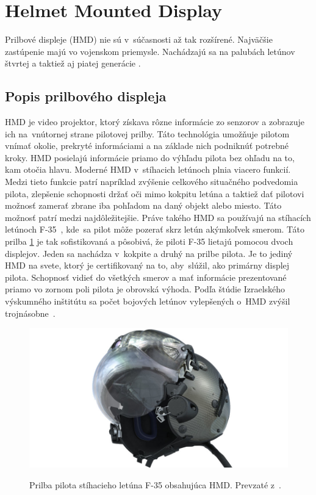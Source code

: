 \section{Helmet Mounted Display}
Prilbové displeje (HMD) nie sú v~súčasnosti až tak rozšírené. Najväčšie zastúpenie majú vo vojenskom priemysle. Nachádzajú sa na palubách letúnov štvrtej a taktiež aj piatej generácie \cite{HMDhelmet}.

\subsection{Popis prilbového displeja}
HMD je video projektor, ktorý získava rôzne informácie zo senzorov a zobrazuje ich na~vnútornej strane pilotovej prilby. Táto technológia umožňuje pilotom vnímať okolie, prekryté informáciami a na základe nich podniknúť potrebné kroky. HMD posielajú informácie priamo do výhľadu pilota bez ohľadu na to, kam otočia hlavu. Moderné HMD v~stíhacich letúnoch plnia viacero funkcií. Medzi tieto funkcie patrí napríklad zvýšenie celkového situačného podvedomia pilota, zlepšenie schopnosti držať oči mimo kokpitu letúna a taktiež dať pilotovi možnosť zamerať zbrane iba pohľadom na daný objekt alebo miesto. Táto možnosť patrí medzi najdôležitejšie. Práve takého HMD sa používajú na stíhacích letúnoch F-35~\cite{F35}, kde~sa pilot môže pozerať skrz letún akýmkoľvek smerom. Táto prilba \ref{HMD} je tak sofistikovaná a pôsobivá, že piloti F-35 lietajú pomocou dvoch displejov. Jeden sa nachádza v~kokpite a druhý na prilbe pilota. Je to jediný HMD na svete, ktorý je certifikovaný na to, aby~slúžil, ako primárny displej pilota. Schopnosť vidieť do všetkých smerov a mať informácie prezentované priamo vo zornom poli pilota je obrovská výhoda. Podľa štúdie Izraelského výskumného inštitútu sa počet bojových letúnov vylepšených o~HMD zvýšil trojnásobne~\cite{HMDhelmet}.

\begin{figure}[ht]
\centering
\includegraphics[scale=0.35]{obrazky-figures/HMDf35w.jpg}
\caption{Prilba pilota stíhacieho letúna F-35 obsahujúca HMD. Prevzaté z~\cite{fotoHelmet}.}{\label{HMD}}
\end{figure}

